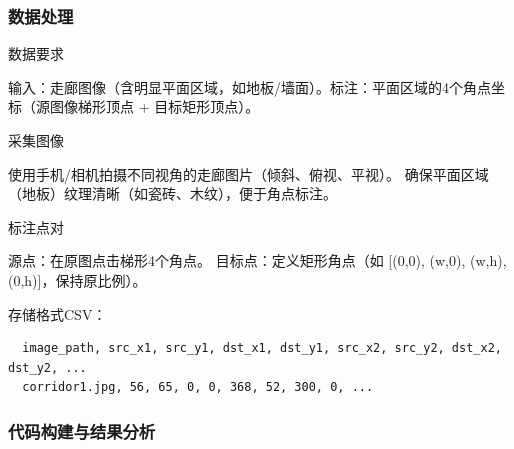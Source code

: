 \documentclass{article}
\begin{document}
\subsubsection{数据处理}

数据要求​

​输入​：走廊图像（含明显平面区域，如地板/墙面）。
​标注​：平面区域的4个角点坐标​（源图像梯形顶点 + 目标矩形顶点）。

​采集图像​

使用手机/相机拍摄不同视角的走廊图片（倾斜、俯视、平视）。
确保平面区域（地板）纹理清晰（如瓷砖、木纹），便于角点标注。

​标注点对​

源点：在原图点击梯形4个角点。
目标点：定义矩形角点（如 [(0,0), (w,0), (w,h), (0,h)]，保持原比例）。

​存储格式​CSV：
\begin{lstlisting}
  image_path, src_x1, src_y1, dst_x1, dst_y1, src_x2, src_y2, dst_x2, dst_y2, ...
  corridor1.jpg, 56, 65, 0, 0, 368, 52, 300, 0, ...
\end{lstlisting}



\subsubsection{代码构建与结果分析}
\end{document}
